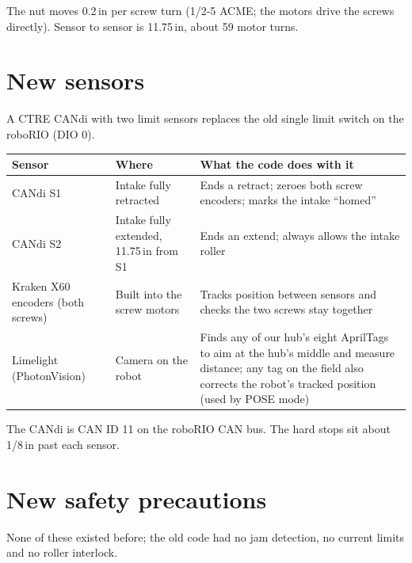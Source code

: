 \documentclass[11pt]{article}
\begin{document}
The nut moves 0.2\,in per screw turn (1/2-5 ACME; the motors drive the screws directly). Sensor
to sensor is 11.75\,in, about 59 motor turns.

\section*{New sensors}

A CTRE CANdi with two limit sensors replaces the old single limit switch on the roboRIO (DIO 0).

\begin{xltabular}{\linewidth}{>{\raggedright\arraybackslash}p{3.4cm} >{\raggedright\arraybackslash}p{3.6cm} L}
\toprule
\textbf{Sensor} & \textbf{Where} & \textbf{What the code does with it} \\
\midrule
\endhead
CANdi S1 & Intake fully retracted & Ends a retract; zeroes both screw encoders; marks the intake ``homed'' \\
CANdi S2 & Intake fully extended, 11.75\,in from S1 & Ends an extend; always allows the intake roller \\
Kraken X60 encoders (both screws) & Built into the screw motors & Tracks position between sensors and checks the two screws stay together \\
Limelight (PhotonVision) & Camera on the robot & Finds any of our hub's eight AprilTags to aim at the hub's middle and measure distance; any tag on the field also corrects the robot's tracked position (used by POSE mode) \\
\bottomrule
\end{xltabular}

The CANdi is CAN ID 11 on the roboRIO CAN bus. The hard stops sit about 1/8\,in past each
sensor.

\section*{New safety precautions}

None of these existed before; the old code had no jam detection, no current limits and no
roller interlock.
\end{document}
